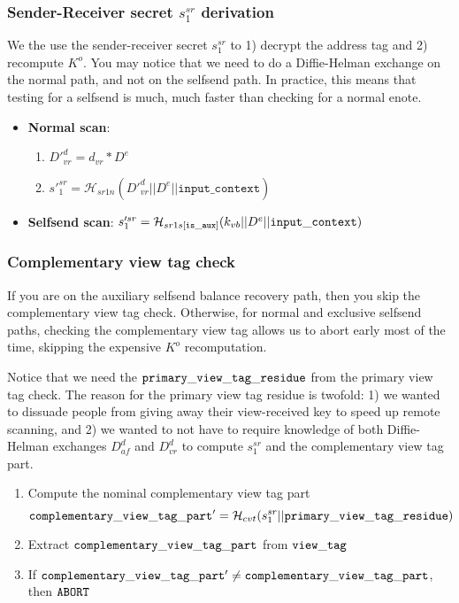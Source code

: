 \subsubsection{Sender-Receiver secret $s^{sr}_1$ derivation}
\label{subsubsec:jamtis-balance-recovery-sr1}

We the use the sender-receiver secret $s^{sr}_1$ to 1) decrypt the address tag and 2) recompute $K^o$. You may notice that we need to do a Diffie-Helman exchange on the normal path, and not on the selfsend path. In practice, this means that testing for a selfsend is much, much faster than checking for a normal enote.

\begin{itemize}
        \item \textbf{Normal scan}:
        \begin{enumerate}
            \item $D'^d_{vr} = d_{vr} * D^e$
            \item $s'^{sr}_1 = \mathcal{H}_{sr1n}(D'^d_{vr} || D^e || \texttt{input\_context})$
        \end{enumerate}
        \item \textbf{Selfsend scan}: $s'^{sr}_1 = \mathcal{H}_{sr1s[{\tt is\_aux}]}(k_{vb} || D^e || {\tt input\_context})$
\end{itemize}

\subsubsection{Complementary view tag check}
\label{subsubsec:jamtis-balance-recovery-comp-check}

If you are on the auxiliary selfsend balance recovery path, then you skip the complementary view tag check. Otherwise, for normal and exclusive selfsend paths, checking the complementary view tag allows us to abort early most of the time, skipping the expensive $K^o$ recomputation.

Notice that we need the ${\tt primary\_view\_tag\_residue}$ from the primary view tag check. The reason for the primary view tag residue is twofold: 1) we wanted to dissuade people from giving away their view-received key to speed up remote scanning, and 2) we wanted to not have to require knowledge of both Diffie-Helman exchanges $D^d_{af}$ and $D^d_{vr}$ to compute $s^{sr}_1$ and the complementary view tag part.

\begin{enumerate}
    \item Compute the nominal complementary view tag part
    \[{\tt complementary\_view\_tag\_part'} = \mathcal{H}_{cvt}(s^{sr}_1 || {\tt primary\_view\_tag\_residue})\]
    \item Extract ${\tt complementary\_view\_tag\_part}$ from ${\tt view\_tag}$
    
    \item If ${\tt complementary\_view\_tag\_part'} \neq {\tt complementary\_view\_tag\_part}$, then ${\tt ABORT}$
\end{enumerate}

